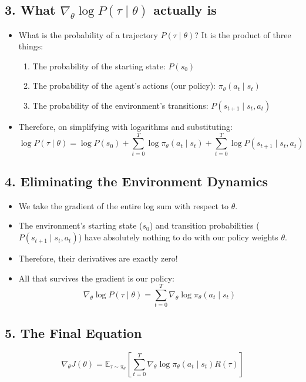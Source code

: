 \documentclass[12pt]{article}
\begin{document}
\subsection*{3. What $\nabla_\theta \log P(\tau \mid \theta)$ actually is}
\begin{itemize}[label=$\bullet$]
    \item What is the probability of a trajectory $P(\tau \mid \theta)$? It is the product of three things:
    \begin{enumerate}
        \item The probability of the starting state: $P(s_0)$
        \item The probability of the agent's actions (our policy): $\pi_\theta(a_t \mid s_t)$
        \item The probability of the environment's transitions: $P(s_{t+1} \mid s_t, a_t)$
    \end{enumerate}
    \item Therefore, on simplifying with logarithms and substituting:
    $$\log P(\tau \mid \theta) = \log P(s_0) + \sum_{t=0}^T \log \pi_\theta(a_t \mid s_t) + \sum_{t=0}^T \log P(s_{t+1} \mid s_t, a_t)$$
\end{itemize}

\subsection*{4. Eliminating the Environment Dynamics}
\begin{itemize}[label=$\bullet$]
    \item We take the gradient of the entire log sum with respect to $\theta$.
    \item The environment's starting state ($s_0$) and transition probabilities ($P(s_{t+1} \mid s_t, a_t)$) have absolutely nothing to do with our policy weights $\theta$. 
    \item Therefore, their derivatives are exactly zero!
    \item All that survives the gradient is our policy:
    $$\nabla_\theta \log P(\tau \mid \theta) = \sum_{t=0}^T \nabla_\theta \log \pi_\theta(a_t \mid s_t)$$
\end{itemize}

\subsection*{5. The Final Equation}
$$\nabla_\theta J(\theta) = \mathbb{E}_{\tau \sim \pi_\theta} \left[ \sum_{t=0}^T \nabla_\theta \log \pi_\theta(a_t \mid s_t) R(\tau) \right]$$
\end{document}

